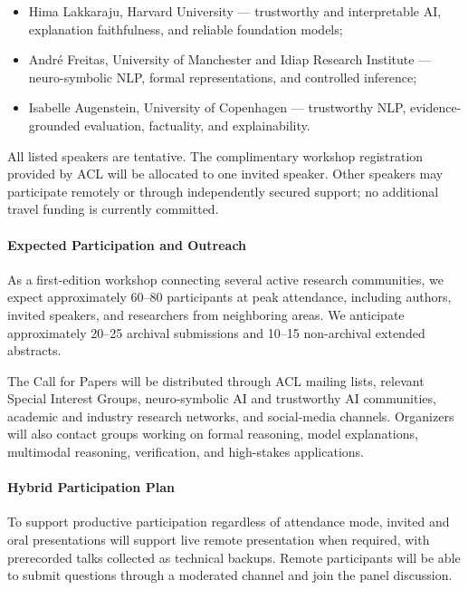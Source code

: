 \documentclass[11pt]{article}
\begin{document}
\begin{itemize}[leftmargin=12pt,noitemsep,topsep=1pt]
    \item Hima Lakkaraju, Harvard University --- trustworthy and
          interpretable AI, explanation faithfulness, and reliable
          foundation models;
    \item Andr\'e Freitas, University of Manchester and Idiap Research
          Institute --- neuro-symbolic NLP, formal representations, and
          controlled inference;
    \item Isabelle Augenstein, University of Copenhagen --- trustworthy
          NLP, evidence-grounded evaluation, factuality, and
          explainability.
\end{itemize}

All listed speakers are tentative. The complimentary workshop
registration provided by ACL will be allocated to one invited speaker.
Other speakers may participate remotely or through independently
secured support; no additional travel funding is currently committed.

\paragraph{Expected Participation and Outreach}

As a first-edition workshop connecting several active research
communities, we expect approximately 60--80 participants at peak
attendance, including authors, invited speakers, and researchers from
neighboring areas. We anticipate approximately 20--25 archival
submissions and 10--15 non-archival extended abstracts.

The Call for Papers will be distributed through ACL mailing lists,
relevant Special Interest Groups, neuro-symbolic AI and trustworthy AI
communities, academic and industry research networks, and social-media
channels. Organizers will also contact groups working on formal
reasoning, model explanations, multimodal reasoning, verification, and
high-stakes applications.

\paragraph{Hybrid Participation Plan}

To support productive participation regardless of attendance mode,
invited and oral presentations will support live remote presentation
when required, with prerecorded talks collected as technical backups.
Remote participants will be able to submit questions through a
moderated channel and join the panel discussion.
\end{document}
